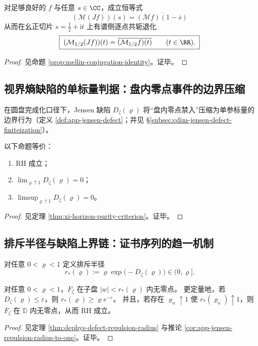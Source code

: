 \begin{proposition}\label{prop:cdim-mellin-inversion-duality}
对足够良好的 \(f\) 与任意 \(s\in\CC\)，成立恒等式
\[
\boxed{\;(\mathcal{M}(Jf))(s)=\overline{(\mathcal{M}f)(1-\overline{s})}\;}
\]
从而在幺正切片 \(s=\tfrac12+\mathrm{i}t\) 上有谱侧逐点共轭退化
\[
\boxed{\;(\mathcal{M}_{1/2}(Jf))(t)=\overline{(\mathcal{M}_{1/2}f)(t)}\qquad(t\in\RR).\;}
\]
\end{proposition}
\begin{proof}
见命题 \ref{prop:mellin-conjugation-identity}。证毕。
\end{proof}

\subsection{视界熵缺陷的单标量判据：盘内零点事件的边界压缩}\label{subsec:cdim-horizon-defect-scalar-criterion}
在圆盘完成化口径下，Jensen 缺陷 \(D_{\zeta}(\varrho)\) 将“盘内零点禁入”压缩为单参标量的边界行为（定义 \ref{def:app-jensen-defect}；并见 \S\ref{subsec:cdim-jensen-defect-finiteization}）。

\begin{theorem}\label{thm:cdim-horizon-purity-criterion}
以下命题等价：
\begin{enumerate}
  \item[(i)] RH 成立；
  \item[(ii)] \(\displaystyle \lim_{\varrho\uparrow 1}D_{\zeta}(\varrho)=0\)；
  \item[(iii)] \(\displaystyle \limsup_{\varrho\uparrow 1}D_{\zeta}(\varrho)=0\)。
\end{enumerate}
\end{theorem}
\begin{proof}
见定理 \ref{thm:xi-horizon-purity-criterion}。证毕。
\end{proof}

\subsection{排斥半径与缺陷上界链：证书序列的趋一机制}\label{subsec:cdim-repulsion-radius-chain}
对任意 \(0<\varrho<1\) 定义排斥半径
\[
r_{\ast}(\varrho):=\varrho\exp\!\bigl(-D_{\zeta}(\varrho)\bigr)\in(0,\varrho].
\]

\begin{theorem}[缺陷诱导的排斥半径]\label{thm:cdim-defect-repulsion-radius}
对任意 \(0<\varrho<1\)，\(F_{\zeta}\) 在子盘 \(|w|<r_{\ast}(\varrho)\) 内无零点。
更定量地，若 \(D_{\zeta}(\varrho)\le\varepsilon\)，则 \(r_{\ast}(\varrho)\ge \varrho e^{-\varepsilon}\)。
并且，若存在 \(\varrho_n\uparrow 1\) 使 \(r_{\ast}(\varrho_n)\uparrow 1\)，则 \(F_{\zeta}\) 在 \(\mathbb{D}\) 内无零点，从而 RH 成立。
\end{theorem}
\begin{proof}
见定理 \ref{thm:dephys-defect-repulsion-radius} 与推论 \ref{cor:app-jensen-repulsion-radius-to-one}。证毕。
\end{proof}

